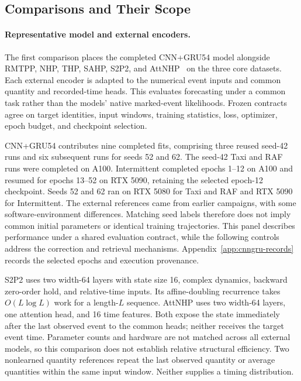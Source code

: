 \documentclass[runningheads]{llncs}
\begin{document}
\subsection{Comparisons and Their Scope}
\paragraph{Representative model and external encoders.}
The first comparison places the completed CNN+GRU54 model alongside RMTPP, NHP, THP, SAHP, S2P2, and AttNHP~\cite{du2016rmtpp,mei2017nhp,zuo2020thp,zhang2020sahp,chang2025s2p2,yang2022anhp} on the three core datasets. Each external encoder is adapted to the numerical event inputs and common quantity and recorded-time heads. This evaluates forecasting under a common task rather than the models' native marked-event likelihoods. Frozen contracts agree on target identities, input windows, training statistics, loss, optimizer, epoch budget, and checkpoint selection.

CNN+GRU54 contributes nine completed fits, comprising three reused seed-42 runs and six subsequent runs for seeds 52 and 62. The seed-42 Taxi and RAF runs were completed on A100. Intermittent completed epochs 1--12 on A100 and resumed for epochs 13--52 on RTX 5090, retaining the selected epoch-12 checkpoint. Seeds 52 and 62 ran on RTX 5080 for Taxi and RAF and RTX 5090 for Intermittent. The external references came from earlier campaigns, with some software-environment differences. Matching seed labels therefore does not imply common initial parameters or identical training trajectories. This panel describes performance under a shared evaluation contract, while the following controls address the correction and retrieval mechanisms. Appendix~\ref{app:cnngru-records} records the selected epochs and execution provenance.

S2P2 uses two width-64 layers with state size 16, complex dynamics, backward zero-order hold, and relative-time inputs. Its affine-doubling recurrence takes $O(L\log L)$ work for a length-$L$ sequence. AttNHP uses two width-64 layers, one attention head, and 16 time features. Both expose the state immediately after the last observed event to the common heads; neither receives the target event time. Parameter counts and hardware are not matched across all external models, so this comparison does not establish relative structural efficiency. Two nonlearned quantity references repeat the last observed quantity or average quantities within the same input window. Neither supplies a timing distribution.
\end{document}
